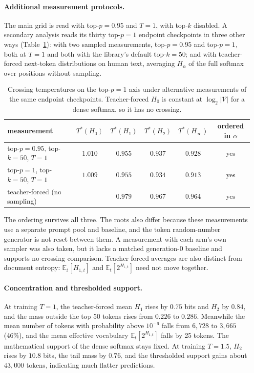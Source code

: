 \documentclass[10pt]{article}
\theoremstyle{plain}
\theoremstyle{definition}
\newcommand{\V}{\mathcal{V}}
\newcommand{\E}{\mathbb{E}}
\newcommand{\Htwo}{H_2}
\newcommand{\Hz}{H_0}
\newcommand{\Hinf}{H_\infty}
\begin{document}
\paragraph{Additional measurement protocols.}
The main grid is read with top-$p=0.95$ and $T=1$, with top-$k$ disabled. A secondary analysis
reads its thirty top-$p=1$ endpoint checkpoints in three other ways (Table~\ref{tab:probes}): with
two sampled measurements, top-$p=0.95$ and top-$p=1$, both at $T=1$ and both with the library's default
top-$k=50$; and with teacher-forced next-token
distributions on human text, averaging $H_\alpha$ of the full softmax over positions without
sampling.

\begin{table}[ht]
\centering\small
\caption{Crossing temperatures on the top-$p=1$ axis under alternative measurements of the same
endpoint checkpoints. Teacher-forced $\Hz$ is constant at $\log_2|\V|$ for a dense softmax, so it
has no crossing.}
\label{tab:probes}
\begin{tabular}{lccccc}
\toprule
measurement & $T^\ast(\Hz)$ & $T^\ast(H_1)$ & $T^\ast(\Htwo)$ & $T^\ast(\Hinf)$ & ordered in $\alpha$ \\
\midrule
top-$p=0.95$, top-$k=50$, $T=1$ & $1.010$ & $0.955$ & $0.937$ & $0.928$ & yes \\
top-$p=1$, top-$k=50$, $T=1$ & $1.009$ & $0.955$ & $0.934$ & $0.913$ & yes \\
teacher-forced (no sampling) & --- & $0.979$ & $0.967$ & $0.964$ & yes \\
\bottomrule
\end{tabular}
\end{table}

The ordering survives all three. The roots also differ because these measurements use a
separate prompt pool and baseline, and the token random-number generator is not reset between
them. A measurement with each arm's own sampler was also taken, but it lacks a matched
generation-0 baseline and supports no crossing comparison. Teacher-forced averages are also
distinct from document entropy: $\E_t[H_{1,t}]$ and $\E_t[2^{H_{1,t}}]$ need not move together.

\paragraph{Concentration and thresholded support.} At training $T=1$, the teacher-forced mean
$H_1$ rises by $0.75$ bits and $H_2$ by $0.84$, and the mass outside the top 50 tokens rises from
$0.226$ to $0.286$. Meanwhile the mean number of tokens with probability above $10^{-6}$ falls
from $6{,}728$ to $3{,}665$ (46\%), and the mean effective vocabulary $\E_t[2^{H_{1,t}}]$ falls
by 25 tokens. The mathematical support of the dense softmax stays fixed. At training $T=1.5$,
$H_2$ rises by $10.8$ bits, the tail mass by $0.76$, and the thresholded support gains about
$43{,}000$ tokens, indicating much flatter predictions.
\end{document}
